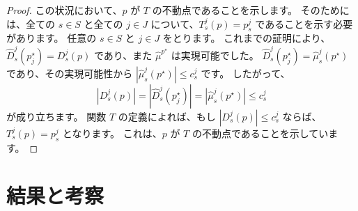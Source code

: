 \documentclass[12pt, a4paper]{article}
\newcommand{\source}[1]{\par\noindent{\footnotesize #1}} %
\theoremstyle{definition}
\theoremstyle{remark}
\theoremstyle{plain}
\begin{document}
\begin{proof}

この状況において、$p$ が $T$ の不動点であることを示します。
そのためには、全ての $s \in S$ と全ての $j \in J$ について、$T_s^j(p) = p_s^j$ であることを示す必要があります。
任意の $s \in S$ と $j \in J$ をとります。
これまでの証明により、$\widehat{D}_s^j(p^\star_j) = D_s^j(p)$ であり、また $\widehat{\mu}^{p^\star}$ は実現可能でした。
$\widehat{D}_s^j(p^\star_j) = \widehat{\mu}_s^j(p^\star)$ であり、その実現可能性から $|\widehat{\mu}_s^j(p^\star)| \leq c_s^j$ です。
したがって、
\[
|D_s^j(p)| = |\widehat{D}_s^j(p^\star_j)| = |\widehat{\mu}_s^j(p^\star)| \leq c_s^j
\]
が成り立ちます。
関数 $T$ の定義によれば、もし $| D_s^j(p) | \leq c^j_s$ ならば、$T_s^j(p) = p_s^j$ となります。
これは、$p$ が $T$ の不動点であることを示しています。
\end{proof}



\section{結果と考察}

\end{document}
